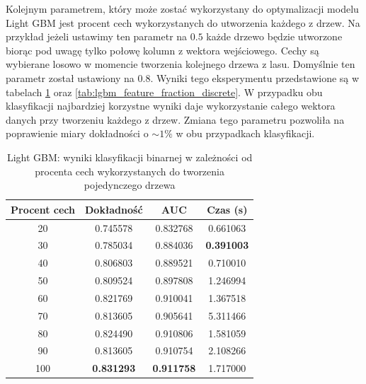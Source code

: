 \documentclass[a4paper, twoside, 11pt, openright]{article}
\begin{document}
Kolejnym parametrem, który może zostać wykorzystany do optymalizacji modelu Light GBM jest procent cech wykorzystanych do utworzenia każdego z drzew. Na przykład jeżeli ustawimy ten parametr na $0.5$ każde drzewo będzie utworzone biorąc pod uwagę tylko połowę kolumn z wektora wejściowego. Cechy są wybierane losowo w momencie tworzenia kolejnego drzewa z lasu. Domyślnie ten parametr został ustawiony na $0.8$. Wyniki tego eksperymentu przedstawione są w tabelach \ref{tab:lgbm_feature_fraction_binary} oraz \ref{tab:lgbm_feature_fraction_discrete}. W przypadku obu klasyfikacji najbardziej korzystne wyniki daje wykorzystanie całego wektora danych przy tworzeniu każdego z drzew. Zmiana tego parametru pozwoliła na poprawienie miary dokładności o $\sim 1\%$ w obu przypadkach klasyfikacji.

\begin{table}[H]
    \centering
    \begin{tabular}{|c|c|c|c|}
    \hline
        \textbf{Procent cech} & \textbf{Dokładność} & \textbf{AUC} & \textbf{Czas (s)} \\ \hline
20              &  0.745578 &  0.832768 &    0.661063 \\ \hline
30              &  0.785034 &  0.884036 &    \textbf{0.391003} \\ \hline
40              &  0.806803 &  0.889521 &    0.710010 \\ \hline
50             &  0.809524 &  0.897808 &    1.246994 \\ \hline
60              &  0.821769 &  0.910041 &    1.367518 \\ \hline
70              &  0.813605 &  0.905641 &    5.311466 \\ \hline
80              &  0.824490 &  0.910806 &    1.581059 \\ \hline
90              &  0.813605 &  0.910754 &    2.108266 \\ \hline
100              &  \textbf{0.831293} &  \textbf{0.911758} &    1.717000 \\ \hline
    \end{tabular}
    \caption{Light GBM: wyniki klasyfikacji binarnej w zależności od procenta cech wykorzystanych do tworzenia pojedynczego drzewa}
    \label{tab:lgbm_feature_fraction_binary}
\end{table}
\end{document}
